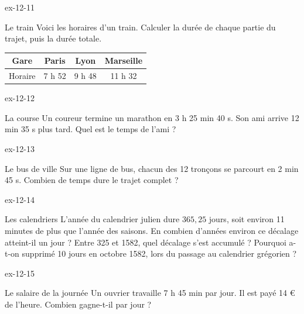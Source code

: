 \begin{blocLivre}{ex-12-11}\begin{exercice}[3]{Le train}
Voici les horaires d’un train. Calculer la durée de chaque partie du trajet, puis la durée totale.\begin{center}\renewcommand{\arraystretch}{1.35}\begin{tabular}{c|ccc}\toprule
Gare & Paris & Lyon & Marseille\\\midrule
Horaire & 7 h 52 & 9 h 48 & 11 h 32\\
\bottomrule\end{tabular}\end{center}
\end{exercice}\end{blocLivre}
\begin{blocLivre}{ex-12-12}\begin{exercice}[3]{La course}
Un coureur termine un marathon en 3 h 25 min 40 s. Son ami arrive 12 min 35 s plus tard. Quel est le temps de l’ami ?
\end{exercice}\end{blocLivre}
\begin{blocLivre}{ex-12-13}\begin{exercice}[3]{Le bus de ville}
Sur une ligne de bus, chacun des 12 tronçons se parcourt en 2 min 45 s. Combien de temps dure le trajet complet ?
\end{exercice}\end{blocLivre}
\begin{blocLivre}{ex-12-14}\begin{exercice}[3]{Les calendriers}
L’année du calendrier julien dure $365{,}25$ jours, soit environ 11 minutes de plus que l’année des saisons. En combien d’années environ ce décalage atteint-il un jour ? Entre 325 et 1582, quel décalage s’est accumulé ? Pourquoi a-t-on supprimé 10 jours en octobre 1582, lors du passage au calendrier grégorien ?
\end{exercice}\end{blocLivre}
\begin{blocLivre}{ex-12-15}\begin{exercice}[3]{Le salaire de la journée}
Un ouvrier travaille 7 h 45 min par jour. Il est payé 14 € de l’heure. Combien gagne-t-il par jour ?
\end{exercice}\end{blocLivre}

\clearpage

